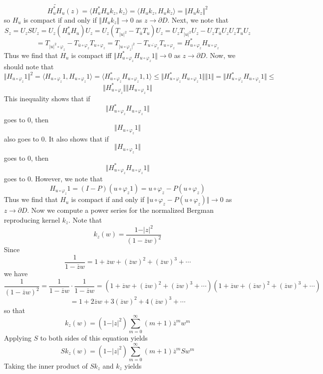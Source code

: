 \documentclass[12pt]{article}
\begin{document}
\[
\widetilde{H_u^* H_u}(z) = \langle H_u^* H_u k_z, k_z \rangle = \langle H_u k_z, H_u k_z \rangle = \Vert H_u k_z \Vert^2
\] so $H_u$ is compact if and only if $\Vert H_u k_z \Vert \rightarrow 0$ as $z \rightarrow \partial{D}$. Next, we note that
\[
S_z = U_z S U_z = U_z(H_u^* H_u)U_z = U_z(T_{\vert u \vert^2} - T_{\overline{u}}T_u)U_z = U_z T_{\vert u \vert^2} U_z - U_z T_{\overline{u}}U_z U_zT_u U_z
\]
\[
= T_{\vert u \vert^2 \circ \varphi_z} - T_{\overline{u}\circ \varphi_z} T_{u \circ \varphi_z} = T_{\vert u \circ \varphi_z \vert^2} - T_{\overline{u \circ \varphi_z}} T_{u \circ \varphi_z} = H_{u \circ \varphi_z}^* H_{u \circ \varphi_z}
\] Thus we find that $H_u$ is compact iff $\Vert H_{u \circ \varphi_z}^* H_{u \circ \varphi_z} 1 \Vert \rightarrow 0$ as $z \rightarrow \partial{D}$. Now, we should note that
\[
\Vert H_{u \circ \varphi_z} 1 \Vert^2 = \langle H_{u \circ \varphi_z} 1, H_{u \circ \varphi_z} 1 \rangle = \langle H_{u \circ \varphi_z}^* H_{u \circ \varphi_z}  1, 1 \rangle \leq \Vert H_{u \circ \varphi_z}^* H_{u \circ \varphi_z} 1 \Vert \Vert 1 \Vert = \Vert H_{u \circ \varphi_z}^* H_{u \circ \varphi_z} 1 \Vert \leq
\]
\[
\Vert H_{u \circ \varphi_z}^* \Vert \Vert H_{u \circ \varphi_z} 1 \Vert 
\] This inequality shows that if 
\[
\Vert H_{u \circ \varphi_z}^* H_{u \circ \varphi_z} 1 \Vert 
\] goes to $0$, then
\[
\Vert H_{u \circ \varphi_z} 1 \Vert
\] also goes to $0$. It also shows that if 
\[
\Vert H_{u \circ \varphi_z} 1 \Vert 
\] goes to $0$, then
\[
\Vert H_{u \circ \varphi_z}^* H_{u \circ \varphi_z} 1 \Vert
\] goes to $0$. However, we note that 
\[
H_{u \circ \varphi_z} 1 = (I-P)(u\circ \varphi_z 1) = u \circ \varphi_z - P(u \circ \varphi_z)
\] Thus we find that $H_u$ is compact if and only if $\Vert u \circ \varphi_z - P(u \circ \varphi_z) \Vert \rightarrow 0$ as $z\rightarrow \partial{D}$. Now we compute a power series for the normalized Bergman reproducing kernel $k_z$. Note that
\[
k_z(w) = \frac{1- \vert z \vert^2}{(1 - \overline{z}w)^2}
\] Since
\[
\frac{1}{1 - \overline{z}w} = 1 + \overline{z}w + (\overline{z}w)^2 + (\overline{z}w)^3 + \cdots
\] we have
\[
\frac{1}{(1 - \overline{z}w)^2} = \frac{1}{1-\overline{z}w}\cdot \frac{1}{1-\overline{z}w} = (1 + \overline{z}w + (\overline{z}w)^2 + (\overline{z}w)^3 + \cdots)(1 + \overline{z}w + (\overline{z}w)^2 + (\overline{z}w)^3 + \cdots)
\]
\[
= 1 + 2 \overline{z}w + 3(\overline{z}w)^2 + 4(\overline{z}w)^3 + \cdots
\] so that
\[
k_z(w) = (1- \vert z \vert^2) \sum_{m=0}^\infty (m+1)\overline{z}^m w^m
\] Applying $S$ to both sides of this equation yields
\[
Sk_z(w) = (1- \vert z \vert^2) \sum_{m = 0}^\infty (m+1)\overline{z}^m Sw^m
\] Taking the inner product of $Sk_z$ and $k_z$ yields
\end{document}
